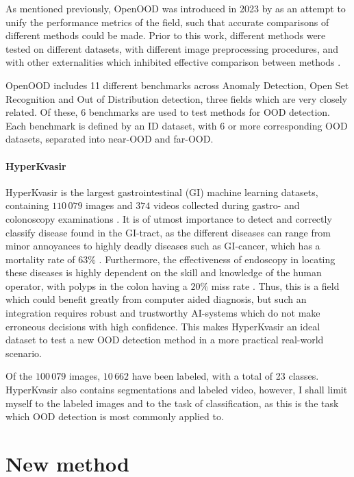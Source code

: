 \documentclass[UKenglish]{uiomasterthesis} %
\theoremstyle{definition}
\begin{document}
As mentioned previously, OpenOOD was introduced in 2023 by \cite{openood} as an attempt to unify the performance metrics of the field, such that accurate comparisons of different methods could be made. Prior to this work, different methods were tested on different datasets, with different image preprocessing procedures, and with other externalities which inhibited effective comparison between methods \cite{openood}.

OpenOOD includes 11 different benchmarks across Anomaly Detection, Open Set Recognition and Out of Distribution detection, three fields which are very closely related. Of these, 6 benchmarks are used to test methods for OOD detection. Each benchmark is defined by an ID dataset, with 6 or more corresponding OOD datasets, separated into near-OOD and far-OOD.

\subsubsection{HyperKvasir} \label{chapter:hyperkvasir}

HyperKvasir is the largest gastrointestinal (GI) machine learning datasets, containing $110 \,079$ images and $374$ videos collected during gastro- and colonoscopy examinations \cite{hyperkvasir}. It is of utmost importance to detect and correctly classify disease found in the GI-tract, as the different diseases can range from minor annoyances to highly deadly diseases such as GI-cancer, which has a mortality rate of $63 \%$ \cite{hyperkvasir}. Furthermore, the effectiveness of endoscopy in locating these diseases is highly dependent on the skill and knowledge of the human operator, with polyps in the colon having a $20 \%$ miss rate \cite{kaminski2010quality}. Thus, this is a field which could benefit greatly from computer aided diagnosis, but such an integration requires robust and trustworthy AI-systems which do not make erroneous decisions with high confidence. This makes HyperKvasir an ideal dataset to test a new OOD detection method in a more practical real-world scenario.

Of the $100 \, 079$ images, $10 \, 662$ have been labeled, with a total of 23 classes. HyperKvasir also contains segmentations and labeled video, however, I shall limit myself to the labeled images and to the task of classification, as this is the task which OOD detection is most commonly applied to.

\chapter{New method} \label{chapter:newmethod}
\end{document}
